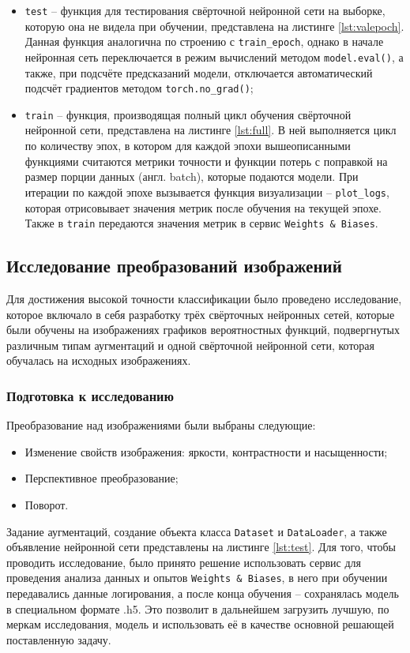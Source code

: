 \documentclass[14pt, russian]{scrartcl}
\begin{document}
\begin{enumerate}
\begin{itemize}
        \item \verb|test| -- функция для тестирования свёрточной нейронной сети на выборке, которую она не видела при обучении, представлена на листинге \ref{lst:valepoch}. Данная функция аналогична по строению с \verb|train_epoch|, однако в начале нейронная сеть переключается в режим вычислений методом \verb|model.eval()|, а также, при подсчёте предсказаний модели, отключается автоматический подсчёт градиентов методом \verb|torch.no_grad()|;

        \item \verb|train| -- функция, производящая полный цикл обучения свёрточной нейронной сети, представлена на листинге \ref{lst:full}. В ней выполняется цикл по количеству эпох, в котором для каждой эпохи вышеописанными функциями считаются метрики точности и функции потерь с поправкой на размер порции данных (англ. batch), которые подаются модели. При итерации по каждой эпохе вызывается функция визуализации -- \verb|plot_logs|, которая отрисовывает значения метрик после обучения на текущей эпохе. Также в \verb|train| передаются значения метрик в сервис \verb|Weights & Biases|.
    \end{itemize}
\end{enumerate}

\subsection{Исследование преобразований изображений}
Для достижения высокой точности классификации было проведено исследование, которое включало в себя разработку трёх свёрточных нейронных сетей, которые были обучены на изображениях графиков вероятностных функций, подвергнутых различным типам аугментаций и одной свёрточной нейронной сети, которая обучалась на исходных изображениях.

\subsubsection{Подготовка к исследованию}
Преобразование над изображениями были выбраны следующие: 
\begin{itemize}
    \item Изменение свойств изображения: яркости, контрастности и насыщенности;
    \item Перспективное преобразование;
    \item Поворот.
\end{itemize}

Задание аугментаций, создание объекта класса \verb|Dataset| и \verb|DataLoader|, а также объявление нейронной сети представлены на листинге \ref{lst:test}.
Для того, чтобы проводить исследование, было принято решение использовать сервис для проведения анализа данных и опытов \verb|Weights & Biases|\cite{wb}, в него при обучении передавались данные логирования, а после конца обучения -- сохранялась модель в специальном формате .h5. Это позволит в дальнейшем загрузить лучшую, по меркам исследования, модель и использовать её в качестве основной решающей поставленную задачу. 
\end{document}
